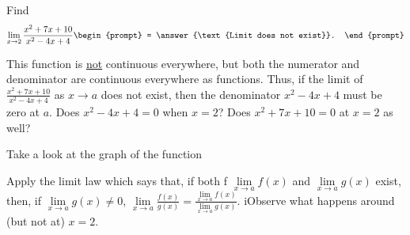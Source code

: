 \documentclass{ximera}
\author{Gregory Hartman \and Matthew Carr}
\begin{document}
\begin{exercise}



  Find 
  \[
  \displaystyle \lim_{x\to 2} \frac{x^2+7x+10}{x^2-4x+4}
  \begin{prompt}
  = \answer{\text{Limit does not exist}}.
  \end{prompt}
  \]
    \begin{hint}
     This function is \underline{not} continuous everywhere, but both the numerator and denominator are continuous everywhere as functions. Thus, if the limit of $\frac{x^2+7x+10}{x^2-4x+4}$ as $x\to{a}$ does not exist, then the denominator $x^2-4x+4$ must be zero at $a$. Does $x^2-4x+4=0$ when $x=2$? Does $x^2+7x+10=0$ at $x=2$ as well?
    \end{hint}
     \begin{hint}
    	Take a look at the graph of the function
    \begin{center}
      \end{center} 
      Apply the limit law which says that, if both f $\lim\limits_{x\to a}f(x)$ and $\lim\limits_{x\to a}g(x)$ exist, then, if $\lim\limits_{x\to a}g(x)\ne0$, $\lim\limits_{x\to{a}}\frac{f(x)}{g(x)}=\frac{\lim\limits_{x\to a}f(x)}{\lim\limits_{x\to{a}}g(x)}$. iObserve what happens around (but not at) $x=2$.
    \end{hint}
    \begin{hint}

\end{hint}
\end{exercise}
\end{document}
